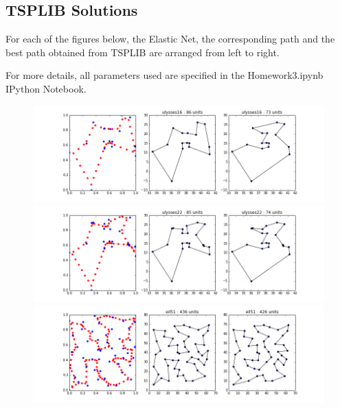 \documentclass{article} %
\begin{document}
\subsection{TSPLIB Solutions}
\label{TSPLIB_solutions}
For each of the figures below, the Elastic Net, the corresponding path and the best path obtained from TSPLIB are arranged from left to right.\newline

For more details, all parameters used are specified in the Homework3.ipynb IPython Notebook.

\begin{figure}[!htb]
\begin{center}
\includegraphics[scale=0.45]{figs/ulysses16}
\includegraphics[scale=0.45]{figs/ulysses22}
\includegraphics[scale=0.45]{figs/eil51}
 \end{center}
\end{figure}
\end{document}
